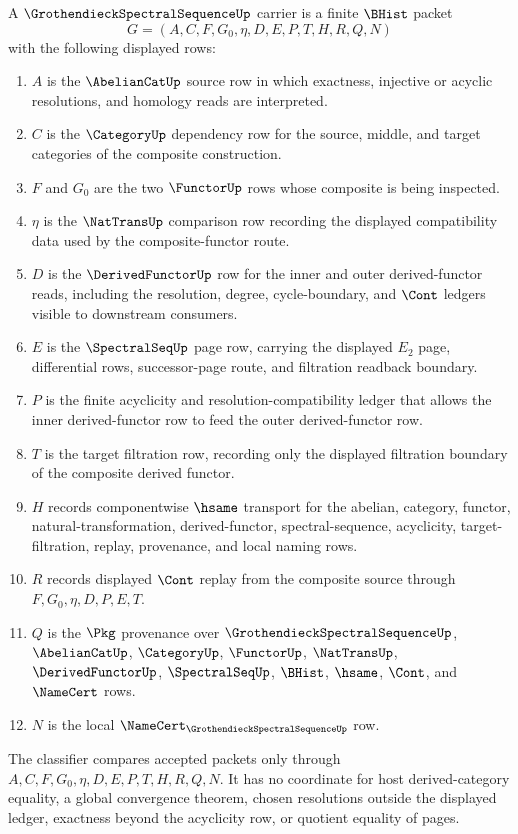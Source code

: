 \begin{definition}
\label{def:grothendieck-spectral-sequence-carrier}
A $\GrothendieckSpectralSequenceUp$ carrier is a finite $\BHist$ packet
$$
G=(A,C,F,G_0,\eta,D,E,P,T,H,R,Q,N)
$$
with the following displayed rows:
\begin{enumerate}
\item $A$ is the $\AbelianCatUp$ source row in which exactness, injective or acyclic resolutions, and homology reads are interpreted.
\item $C$ is the $\CategoryUp$ dependency row for the source, middle, and target categories of the composite construction.
\item $F$ and $G_0$ are the two $\FunctorUp$ rows whose composite is being inspected.
\item $\eta$ is the $\NatTransUp$ comparison row recording the displayed compatibility data used by the composite-functor route.
\item $D$ is the $\DerivedFunctorUp$ row for the inner and outer derived-functor reads, including the resolution, degree, cycle-boundary, and $\Cont$ ledgers visible to downstream consumers.
\item $E$ is the $\SpectralSeqUp$ page row, carrying the displayed $E_2$ page, differential rows, successor-page route, and filtration readback boundary.
\item $P$ is the finite acyclicity and resolution-compatibility ledger that allows the inner derived-functor row to feed the outer derived-functor row.
\item $T$ is the target filtration row, recording only the displayed filtration boundary of the composite derived functor.
\item $H$ records componentwise $\hsame$ transport for the abelian, category, functor, natural-transformation, derived-functor, spectral-sequence, acyclicity, target-filtration, replay, provenance, and local naming rows.
\item $R$ records displayed $\Cont$ replay from the composite source through $F,G_0,\eta,D,P,E,T$.
\item $Q$ is the $\Pkg$ provenance over $\GrothendieckSpectralSequenceUp$, $\AbelianCatUp$, $\CategoryUp$, $\FunctorUp$, $\NatTransUp$, $\DerivedFunctorUp$, $\SpectralSeqUp$, $\BHist$, $\hsame$, $\Cont$, and $\NameCert$ rows.
\item $N$ is the local $\NameCert_{\GrothendieckSpectralSequenceUp}$ row.
\end{enumerate}
The classifier compares accepted packets only through $A,C,F,G_0,\eta,D,E,P,T,H,R,Q,N$. It has no coordinate for host derived-category equality, a global convergence theorem, chosen resolutions outside the displayed ledger, exactness beyond the acyclicity row, or quotient equality of pages.
\end{definition}

